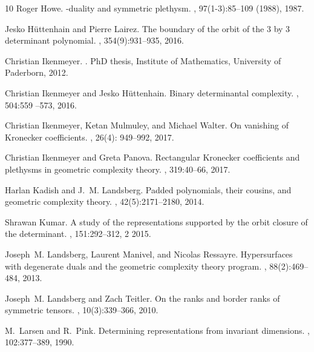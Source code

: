 \documentclass[11pt]{amsart}
\numberwithin{equation}{section}
\begin{document}
\begin{thebibliography}{10}
Roger Howe.
-duality and symmetric plethysm.
, 97(1-3):85--109 (1988), 1987. 

Jesko H{\"u}ttenhain and Pierre Lairez.
\newblock The boundary of the orbit of the 3 by 3 determinant polynomial.
, 354(9):931--935, 2016.

Christian Ikenmeyer.
.
\newblock PhD thesis, Institute of Mathematics, University of Paderborn, 2012.

Christian Ikenmeyer and Jesko H\"{u}ttenhain.
\newblock Binary determinantal complexity.
, 504:559 --573, 2016.

Christian Ikenmeyer, Ketan Mulmuley, and Michael Walter.
\newblock On vanishing of {K}ronecker coefficients.
, 26(4): 949--992, 2017.

Christian Ikenmeyer and Greta Panova.
\newblock Rectangular {K}ronecker coefficients and plethysms in geometric complexity theory.
, 319:40--66, 2017.

Harlan Kadish and J.~M. Landsberg.
\newblock Padded polynomials, their cousins, and geometric complexity theory.
, 42(5):2171--2180, 2014.

Shrawan Kumar.
\newblock A study of the representations supported by the orbit closure of the
  determinant.
, 151:292--312, 2 2015.

Joseph~M. Landsberg, Laurent Manivel, and Nicolas Ressayre.
\newblock Hypersurfaces with degenerate duals and the geometric complexity
  theory program.
, 88(2):469--484, 2013.

Joseph~M. Landsberg and Zach Teitler.
\newblock On the ranks and border ranks of symmetric tensors.
, 10(3):339--366, 2010.

M.~Larsen and R.~Pink.
\newblock Determining representations from invariant dimensions.
, 102:377--389, 1990.


\end{thebibliography}
\end{document}
